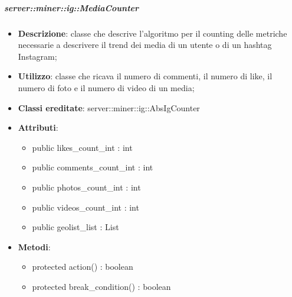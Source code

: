 	\subparagraph{server::miner::ig::MediaCounter} %
		\label{subp:server_miner_ig_MediaCounter}
			\begin{itemize}
				\item \textbf{Descrizione}: classe che descrive l'algoritmo per il counting delle metriche necessarie a descrivere il trend dei media di un utente o di un hashtag  Instagram;
				\item \textbf{Utilizzo}: classe che ricava il numero di commenti, il numero di like, il numero di foto e il numero di video di un media;
				\item \textbf{Classi ereditate}: server::miner::ig::AbsIgCounter
				\item \textbf{Attributi}:    
					\begin{itemize}
						\item public likes\_count\_int : int
						\item public comments\_count\_int : int
						\item public photos\_count\_int : int
						\item public videos\_count\_int : int
						\item public geolist\_list : List
					\end{itemize}
				\item \textbf{Metodi}:  
					\begin{itemize}
						\item protected action() : boolean
						\item protected break\_condition() : boolean
					\end{itemize}
			\end{itemize}


